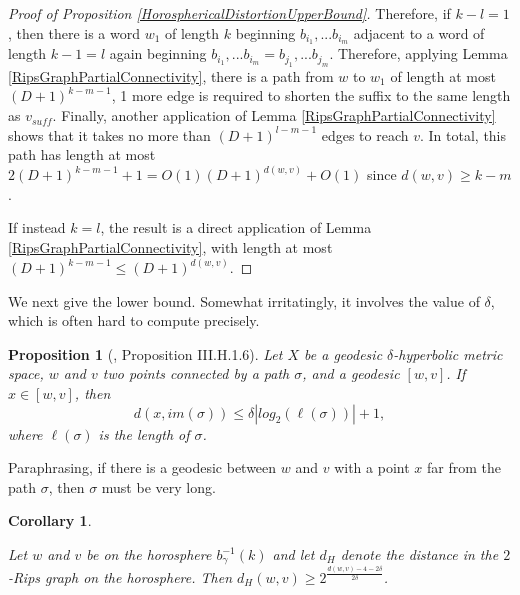 \documentclass[10pt,a4paper]{amsart}
\newtheorem{corollary}[theorem]{Corollary}
\newtheorem{proposition}[theorem]{Proposition}
\theoremstyle{definition}
\theoremstyle{remark}
\begin{document}
\begin{proof} [Proof of Proposition \ref{HorosphericalDistortionUpperBound}]
		Therefore, if $k-l=1$, then there is a word $w_1$ of length $k$ beginning $b_{i_1}, ... b_{i_m}$ adjacent to a word of length $k-1=l$ again beginning $b_{i_1}, ... b_{i_m}= b_{j_1}, ... b_{j_m}$. Therefore, applying Lemma \ref{RipsGraphPartialConnectivity}, there is a path from $w$ to $w_1$ of length at most $(D+1)^{k-m-1}$, 1 more edge is required to shorten the suffix to the same length as $v_{suff}$. Finally, another application of Lemma \ref{RipsGraphPartialConnectivity} shows that it takes no more than $(D+1)^{l-m-1}$ edges to reach $v$. In total, this path has length at most $2(D+1)^{k-m-1}+1=O(1)(D+1)^{d(w,v)}+O(1)$ since $d(w,v)\ge k-m$.
		
		If instead $k=l$, the result is a direct application of Lemma \ref{RipsGraphPartialConnectivity}, with length at most $(D+1)^{k-m-1}\le (D+1)^{d(w,v)}$.		
	\end{proof}
	
	We next give the lower bound. Somewhat irritatingly, it involves the value of $\delta$, which is often hard to compute precisely.
	
	\begin{proposition}[\cite{BridsonHaefliger}, Proposition III.H.1.6]
		
		Let $X$ be a geodesic $\delta$-hyperbolic metric space, $w$ and $v$ two points connected by a path $\sigma$, and a geodesic $[w,v]$. If $x\in[w,v]$, then 
        $$d(x, im(\sigma))\le \delta |log_{2}(\ell(\sigma))|+1,$$
        where $\ell(\sigma)$ is the length of $\sigma$.
		
	\end{proposition}
	
	Paraphrasing, if there is a geodesic between $w$ and $v$ with a point $x$ far from the path $\sigma$, then $\sigma$ must be very long.
	
	\begin{corollary} \label{HorosphericalDistortionLowerBound}
		
		Let $w$ and $v$ be on the horosphere $b_{\gamma}^{-1}(k)$ and let $d_H$ denote the distance in the $2$-Rips graph on the horosphere. Then $d_H(w, v)\ge 2^{\frac{d(w, v)-4-2\delta}{2\delta}}$.
		
	\end{corollary}
	
\end{document}
